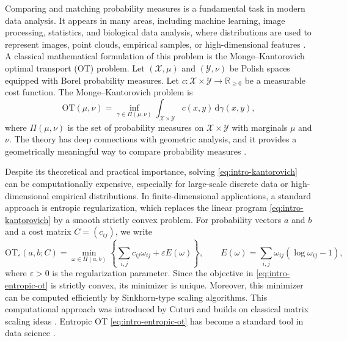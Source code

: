 \documentclass[a4paper,11pt]{article}
\numberwithin{equation}{section}
\newcommand{\eps}{\varepsilon}
\newcommand{\RR}{\mathbb{R}}
\newcommand{\OT}{\mathrm{OT}}
\newcommand{\dd}{\,\mathrm{d}}
\newcommand{\X}{\mathcal{X}}
\newcommand{\Y}{\mathcal{Y}}
\begin{document}
Comparing and matching probability measures is a fundamental task in modern data analysis. It appears in many areas, including machine learning, image processing, statistics, and biological data analysis, where distributions are used to represent images, point clouds, empirical samples, or high-dimensional features \cite{peyre2019computational}. A classical mathematical formulation of this problem is the Monge--Kantorovich optimal transport (OT) problem. Let $(\X,\mu)$ and $(\Y,\nu)$ be Polish spaces equipped with Borel probability measures. Let $c:\X \times \Y \to \RR_{\geq 0}$ be a measurable cost function. The Monge--Kantorovich problem is
\begin{equation}\label{eq:intro-kantorovich}
  \OT(\mu,\nu) = \inf_{\gamma \in \Pi(\mu,\nu)} \int_{\X\times\Y} c(x,y)\dd\gamma(x,y),
\end{equation}
where $\Pi(\mu,\nu)$ is the set of probability measures on $\X\times\Y$ with marginals $\mu$ and $\nu$. The theory has deep connections with geometric analysis, and it provides a geometrically meaningful way to compare probability measures \cite{ambrosio2021lectures,figalli2021invitation,santambrogio2015optimal,villani2009optimal}.

Despite its theoretical and practical importance, solving
\eqref{eq:intro-kantorovich} can be computationally expensive, especially for large-scale discrete data or high-dimensional empirical distributions. In finite-dimensional applications, a standard approach is entropic regularization, which replaces the linear program \eqref{eq:intro-kantorovich} by a smooth strictly convex problem. For probability vectors $a$ and $b$ and a cost matrix
$C = (c_{ij})$, we write
\begin{equation}\label{eq:intro-entropic-ot}
  \OT_{\eps}(a,b;C) = \min_{\omega \in \Pi(a,b)} \left\{ \sum_{i,j} c_{ij}\omega_{ij} + \eps E(\omega) \right\}, \qquad E(\omega) = \sum_{i,j}\omega_{ij}(\log\omega_{ij}-1),
\end{equation}
where $\eps > 0$ is the regularization parameter. Since the objective in \eqref{eq:intro-entropic-ot} is strictly convex, its minimizer is unique. Moreover, this minimizer can be computed efficiently by Sinkhorn-type scaling algorithms. This computational approach was introduced by Cuturi \cite{cuturi2013sinkhorn} and builds on classical matrix scaling ideas \cite{sinkhorn1964relationship,sinkhornknopp1967}. Entropic OT \eqref{eq:intro-entropic-ot} has become a standard tool in data science \cite{feydy2019interpolating,genevay2018learning,peyre2019computational}.
\end{document}
